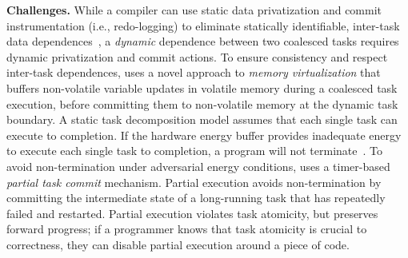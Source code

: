 \textbf{Challenges.} While a compiler can use static data privatization and commit instrumentation
(i.e., redo-logging) to eliminate statically identifiable, inter-task data
dependences~\citep{alpaca}, a \emph{dynamic} dependence between two coalesced
tasks requires dynamic privatization and commit actions. 
%
To ensure consistency and respect inter-task dependences, \sys uses a novel
approach to \emph{memory virtualization} that buffers non-volatile variable
updates in volatile memory during a coalesced task execution, before committing
them to non-volatile memory at the dynamic task boundary.
%
A static task decomposition model assumes that each
single task can execute to completion. If the hardware energy buffer provides
inadequate energy to execute each single task to completion, a program will not
terminate~\cite{cleancut_2018}. To avoid non-termination under adversarial
energy conditions, \sys uses a timer-based {\em partial task commit} mechanism.
Partial execution avoids non-termination by committing the intermediate state of a long-running
task that has repeatedly failed and restarted. Partial execution violates
task atomicity, but preserves forward progress; if a programmer knows that
task atomicity is crucial to correctness, they can disable partial execution around a piece of code.

%

